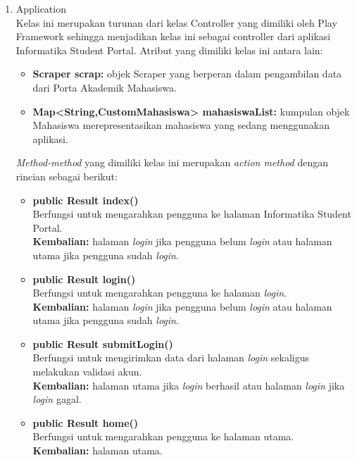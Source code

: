 	\begin{enumerate}
		\item Application\\
		Kelas ini merupakan turunan dari kelas Controller yang dimiliki oleh Play Framework sehingga menjadikan kelas ini sebagai controller dari aplikasi Informatika Student Portal. Atribut yang dimiliki kelas ini antara lain:
		\begin{itemize}
			\item \textbf{Scraper scrap:} objek Scraper yang berperan dalam pengambilan data dari Porta Akademik Mahasiswa.
			\item \textbf{Map<String,CustomMahasiswa> mahasiswaList:} kumpulan objek Mahasiswa merepresentasikan mahasiswa yang sedang menggunakan aplikasi.
		\end{itemize}
	\textit{Method-method} yang dimiliki kelas ini merupakan \textit{action method} dengan rincian sebagai berikut:
		\begin{itemize}
			
			\item \textbf{public Result index()}\\
				Berfungsi untuk mengarahkan pengguna ke halaman Informatika Student Portal.\\
				\textbf{Kembalian:} halaman \textit{login} jika pengguna belum \textit{login} atau halaman utama jika pengguna sudah \textit{login}.
				
			\item \textbf{public Result login()}\\
				Berfungsi untuk mengarahkan pengguna ke halaman \textit{login}.\\
				\textbf{Kembalian:} halaman \textit{login} jika pengguna belum \textit{login} atau halaman utama jika pengguna sudah \textit{login}.
				
			\item \textbf{public Result submitLogin()}\\
				Berfungsi untuk mengirimkan data dari halaman \textit{login} sekaligus melakukan validasi akun.\\
				\textbf{Kembalian:} halaman utama jika \textit{login} berhasil atau halaman \textit{login} jika \textit{login} gagal.
				
			\item \textbf{public Result home()}\\
				Berfungsi untuk mengarahkan pengguna ke halaman utama.\\
				\textbf{Kembalian:} halaman utama.
				

\end{itemize}
\end{enumerate}
